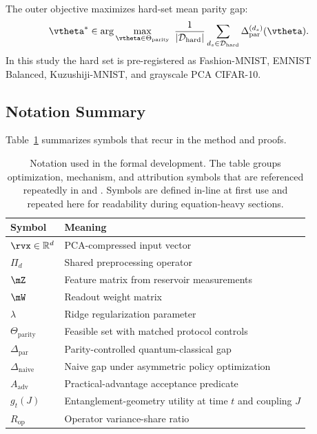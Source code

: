 \documentclass{article} %
\begin{document}
The outer objective maximizes hard-set mean parity gap:
\begin{equation}
\vtheta^* \in \arg\max_{\vtheta\in\Theta_{\mathrm{parity}}}\ \frac{1}{|\mathcal{D}_{\mathrm{hard}}|}\sum_{d_s\in\mathcal{D}_{\mathrm{hard}}} \Delta_{\mathrm{par}}^{(d_s)}(\vtheta).
\label{eq:outer_obj}
\end{equation}
In this study the hard set is pre-registered as Fashion-MNIST, EMNIST Balanced, Kuzushiji-MNIST, and grayscale PCA CIFAR-10.

\subsection{Notation Summary}
Table~\ref{tab:notation} summarizes symbols that recur in the method and proofs.

\begin{table}[t]
\caption{Notation used in the formal development. The table groups optimization, mechanism, and attribution symbols that are referenced repeatedly in  and . Symbols are defined in-line at first use and repeated here for readability during equation-heavy sections.}
\label{tab:notation}
\begin{center}
\small
\renewcommand{\arraystretch}{1.1}
\setlength{\tabcolsep}{4pt}
\begin{tabular}{ll}
\hline
Symbol & Meaning \\
\hline
$\rvx\in\mathbb{R}^{d}$ & PCA-compressed input vector \\
$\Pi_d$ & Shared preprocessing operator \\
$\mZ$ & Feature matrix from reservoir measurements \\
$\mW$ & Readout weight matrix \\
$\lambda$ & Ridge regularization parameter \\
$\Theta_{\mathrm{parity}}$ & Feasible set with matched protocol controls \\
$\Delta_{\mathrm{par}}$ & Parity-controlled quantum-classical gap \\
$\Delta_{\mathrm{naive}}$ & Naive gap under asymmetric policy optimization \\
$A_{\mathrm{adv}}$ & Practical-advantage acceptance predicate \\
$g_t(J)$ & Entanglement-geometry utility at time $t$ and coupling $J$ \\
$R_{\mathrm{op}}$ & Operator variance-share ratio \\
\hline
\end{tabular}
\end{center}
\end{table}
\end{document}
